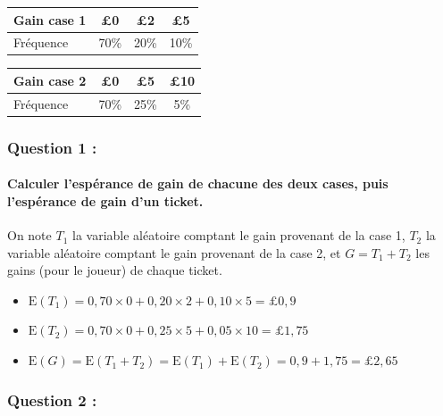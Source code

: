 \documentclass[a4paper, 12pt]{article}
\begin{document}
\begin{center}
\begin{tabular}{ |l|c|c|c| }
    \hline
    Gain case 1 & £0 & £2 & £5 \\
    \hline
    Fréquence & 70\% & 20\% & 10\% \\
    \hline
\end{tabular}
\hspace{1cm}
\begin{tabular}{ |l|c|c|c| }
    \hline
    Gain case 2 & £0 & £5 & £10 \\
    \hline
    Fréquence & 70\% & 25\% & 5\% \\
    \hline
\end{tabular}
\end{center}

{}
\subsubsection*{Question 1 :}
\paragraph*{Calculer l'espérance de gain de chacune des deux cases, puis l'espérance de gain d'un ticket.\\[5mm]}

On note $T_1$ la variable aléatoire comptant le gain provenant de la case 1, $T_2$ la variable aléatoire comptant le gain provenant de la case 2, 
et $G = T_1 + T_2$ les gains (pour le joueur) de chaque ticket. \\
\begin{itemize}
    \item[\textbullet] $\text{E}(T_1) = 0,70 \times 0 + 0,20 \times 2 + 0,10 \times 5 = \pounds 0,9$ \\
    \item[\textbullet] $\text{E}(T_2) = 0,70 \times 0 + 0,25 \times 5 + 0,05 \times 10 = \pounds 1,75$ \\
    \item[\textbullet] $\text{E}(G) = \text{E}(T_1 + T_2) = \text{E}(T_1) + \text{E}(T_2) = 0,9 + 1,75 = \pounds 2,65$ \\
\end{itemize}

{}
\subsubsection*{Question 2 :}
\end{document}
